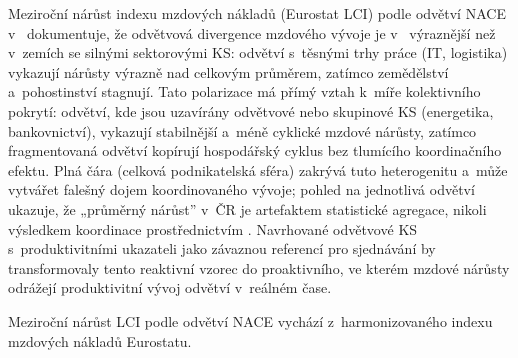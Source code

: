 Meziroční nárůst indexu mzdových nákladů (Eurostat \ac{LCI}) podle odvětví \ac{NACE} v~ dokumentuje, že odvětvová divergence mzdového vývoje je v~ výraznější než v~zemích se silnými sektorovými \ac{KS}: odvětví s~těsnými trhy práce (IT, logistika) vykazují nárůsty výrazně nad celkovým průměrem, zatímco zemědělství a~pohostinství stagnují.
Tato polarizace má přímý vztah k~míře kolektivního pokrytí: odvětví, kde jsou uzavírány odvětvové nebo skupinové \ac{KS} (energetika, bankovnictví), vykazují stabilnější a~méně cyklické mzdové nárůsty, zatímco fragmentovaná odvětví kopírují hospodářský cyklus bez tlumícího koordinačního efektu.
Plná čára (celková podnikatelská sféra) zakrývá tuto heterogenitu a~může vytvářet falešný dojem koordinovaného vývoje; pohled na jednotlivá odvětví ukazuje, že „průměrný nárůst” v~ČR je artefaktem statistické agregace, nikoli výsledkem koordinace prostřednictvím .
Navrhované odvětvové \ac{KS} s~produktivitními ukazateli jako závaznou referencí pro sjednávání by transformovaly tento reaktivní vzorec do proaktivního, ve kterém mzdové nárůsty odrážejí produktivitní vývoj odvětví v~reálném čase.

Meziroční nárůst \acs{LCI} podle odvětví \acs{NACE} vychází z~harmonizovaného indexu mzdových nákladů Eurostatu.\par


